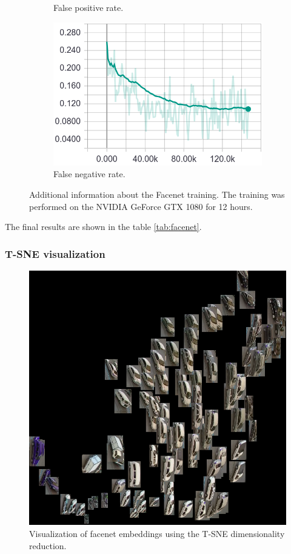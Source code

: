 \documentclass[a4paper,12pt,titlepage, twoside]{article}
\numberwithin{figure}{section}
\begin{document}
\begin{figure}[H]
\begin{subfigure}[Sample1]{0.5\linewidth}
        \caption{False positive rate.}   
        \label{fig:facenet}
    \end{subfigure}
    \begin{subfigure}[Sample1]{0.5\linewidth} 
    	\includegraphics[width=0.95\linewidth]{fig/facenet/fnr.png}
        \caption{False negative rate.}   
        \label{fig:facenet}
    \end{subfigure}       
    \caption{Additional information about the Facenet training. The training was performed on the NVIDIA GeForce GTX 1080 for 12 hours.}
    \label{fig:facenet_training_additional}
\end{figure}

The final results are shown in the table \ref{tab:facenet}.

\subsubsection{T-SNE visualization}
\begin{figure}[h!]
\centering
\includegraphics[width=0.5\linewidth]{fig/tsne0.png}
\caption{Visualization of facenet embeddings using the T-SNE dimensionality reduction.}
\label{fig:facenet_training}
\end{figure}
\end{document}
